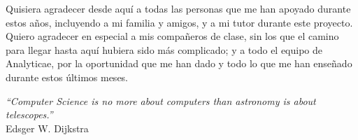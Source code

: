 \documentclass[twoside, openright]{report}
\begin{document}
	
	
	\paginavacia
	
	\paginavacia
	
	\thispagestyle{plain}
	\vspace*{\fill}
	Quisiera agradecer desde aquí a todas las personas que me han apoyado durante estos años, incluyendo a mi familia y amigos, y a mi tutor durante este proyecto. Quiero agradecer en especial a mis compañeros de clase, sin los que el camino para llegar hasta aquí hubiera sido más complicado; y a todo el equipo de Analyticae, por la oportunidad que me han dado y todo lo que me han enseñado durante estos últimos meses.\\
	\vspace{3cm}
	\begin{flushright}
		\emph{``Computer Science is no more about computers than astronomy is about telescopes.''}\\ Edsger W. Dijkstra
	\end{flushright}
	\vspace*{\fill}
	
	
	
	
	\tableofcontents
	\listoffigures
	\listofalgorithms
	\listoftables
	
	\glsaddall\printglossary[type = \acronymtype, title = {Acrónimos y siglas}]
	
	
	
	
	\pagestyle{mypagestyle}
	
	
	
	
	\pagestyle{plain}
	\printbibliography
	
	\appendix
	
	
	
	
\end{document}
